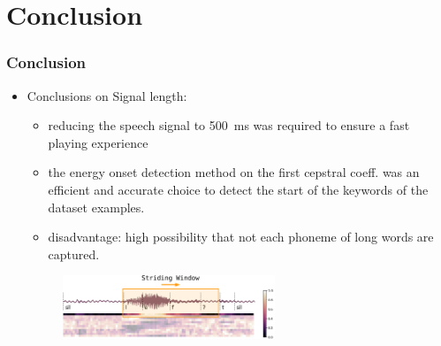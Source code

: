 
\section{Conclusion}
\begin{frame}
  \frametitle{Conclusion}
  \begin{itemize}
    \item Conclusions on Signal length:
    \begin{itemize}
      \item reducing the speech signal to \SI{500}{\milli\second} was required to ensure a fast playing experience
      \item the energy onset detection method on the first cepstral coeff. was an efficient and accurate choice to detect the start of the keywords of the dataset examples.
      \item disadvantage: high possibility that not each phoneme of long words are captured.
    \end{itemize}
    \begin{figure} \includegraphics[width=0.6\textwidth]{../3_signal/figs/signal_onset_window.pdf} \end{figure}
  \end{itemize}
\end{frame}

